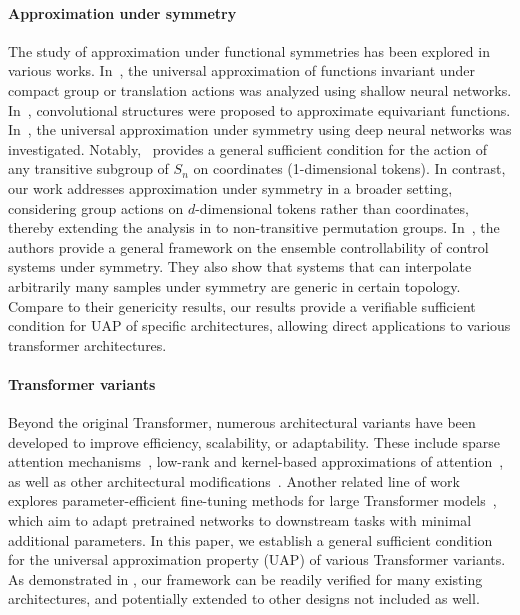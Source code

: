 \documentclass{article}
\begin{document}
\paragraph{Approximation under symmetry}
The study of approximation under functional symmetries has been explored in various works. 
In~\cite{yarotsky2022universal}, the universal approximation of functions invariant under compact group or translation actions was analyzed using shallow neural networks. 
In~\cite{cohen2016group,finzi2020generalizing}, convolutional structures were proposed to approximate equivariant functions.
In~\cite{ravanbakhsh2020universal,maron2019universality,li2024deep}, the universal approximation under symmetry  using deep neural networks was investigated.
Notably,~\cite{li2024deep} provides a general sufficient condition for the action of any transitive subgroup of $S_n$ on coordinates (1-dimensional tokens). In contrast, our work addresses approximation under symmetry in a broader setting, considering group actions on $d$-dimensional tokens rather than coordinates, thereby extending the analysis in \cite{li2024deep} to non-transitive permutation groups. In~\cite{agrachev2025generic}, the authors provide a general framework on the ensemble controllability of control systems under symmetry. They also show that systems that can interpolate arbitrarily many samples under symmetry are generic in certain topology. Compare to their genericity results, our results provide a verifiable sufficient condition for UAP of specific architectures, allowing direct applications to various transformer architectures.

\paragraph{Transformer variants}
Beyond the original Transformer, numerous architectural variants have been developed to improve efficiency, scalability, or adaptability. These include sparse attention mechanisms~\cite{beltagy2020longformer,correia2019adaptively,kitaev2020reformer,zaheer2020big,guo2019star}, low-rank and kernel-based approximations of attention~\cite{wang2020linformer,choromanski2020rethinking,xiong2021nystromformer}, as well as other architectural modifications~\cite{liu2023blockwise,haldar2024baku,mamega,zhai2021attention}.
Another related line of work explores parameter-efficient fine-tuning methods for large Transformer models~\cite{hu2022lora,liu2024dora,meng2024pissa,jia2022visual,zhang2024parameter,zhangweight}, which aim to adapt pretrained networks to downstream tasks with minimal additional parameters.
In this paper, we establish a general sufficient condition for the universal approximation property (UAP) of various Transformer variants. As demonstrated in , our framework can be readily verified for many existing architectures, and potentially extended to other designs not included as well.
\end{document}
